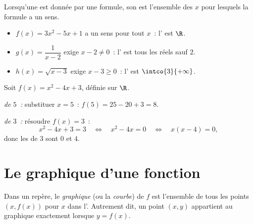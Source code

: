\begin{example}\label{ex:g10:functions:domain}
Lorsqu'une  est donnée par une formule, son  est l'ensemble des $x$ pour lesquels la formule a un sens.
\begin{itemize}
  \item $f(x) = 3x^2 - 5x + 1$ a un sens pour tout $x$~: l' est $\R$.
  \item $g(x) = \dfrac{1}{x - 2}$ exige $x - 2 \neq 0$~: l' est tous les réels sauf $2$.
  \item $h(x) = \sqrt{x - 3}$ exige $x - 3 \geq 0$~: l' est $\intco{3}{+\infty}$.
\end{itemize}
\end{example}

\begin{example}\label{ex:g10:functions:images}
Soit $f(x) = x^2 - 4x + 3$, définie sur $\R$.

\emph{ de $5$~:} substituer $x = 5$~:
$f(5) = 25 - 20 + 3 = 8$.

\emph{ de $3$~:} résoudre $f(x) = 3$~:
\[
x^2 - 4x + 3 = 3
\quad\Longleftrightarrow\quad
x^2 - 4x = 0
\quad\Longleftrightarrow\quad
x(x - 4) = 0,
\]
donc les  de $3$ sont $0$ et $4$.
\end{example}

\section{Le graphique d'une fonction}

\begin{definition}[Graphique]\label{def:g10:functions:graph}
Dans un repère, le \emph{graphique} (ou la
\emph{courbe}) de $f$ est l'ensemble de tous les points $(x, f(x))$ pour
$x$ dans l'. Autrement dit, un point $(x, y)$
appartient au graphique exactement lorsque $y = f(x)$.
\end{definition}

